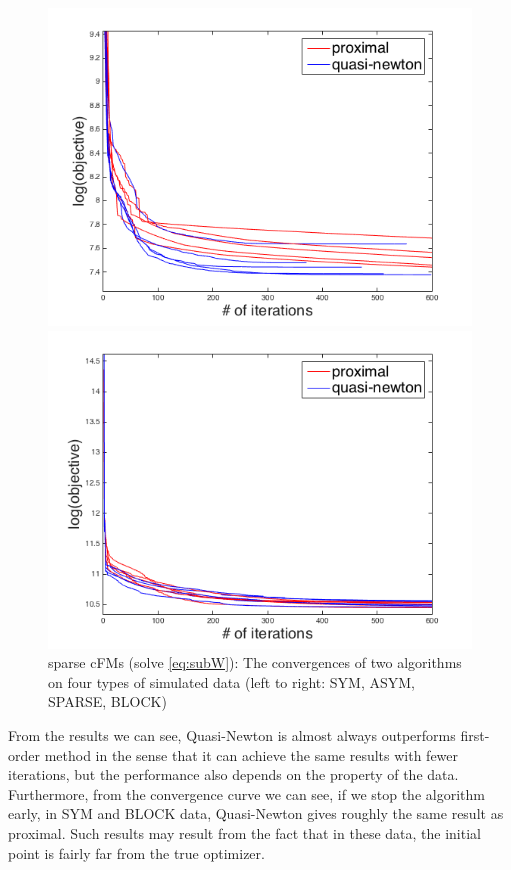 \documentclass{article}
\begin{document}
\begin{figure}[htbp]
\begin{minipage}{0.24\textwidth}
    \centering
    \includegraphics[width=1\textwidth]{../yanyu_code/plots/sparse_p30}
  \end{minipage}
  \hfill
  \begin{minipage}{0.24\textwidth}
    \centering
    \includegraphics[width=1\textwidth]{../yanyu_code/plots/block_p30}
  \end{minipage}
  \caption{sparse cFMs (solve \cref{eq:subW}): The convergences of two algorithms on four types of simulated data (left to right: SYM, ASYM, SPARSE, BLOCK)}
  \label{fig:argminW_curve}
\end{figure}
From the results we can see, Quasi-Newton is almost always outperforms first-order method in the sense that it can achieve the same results with fewer iterations, but the performance also depends on the property of the data. Furthermore, from the convergence curve we can see, if we stop the algorithm early, in SYM and BLOCK data, Quasi-Newton gives roughly the same result as proximal. Such results may result from the fact that in these data, the initial point is fairly far from the true optimizer.
\end{document}
